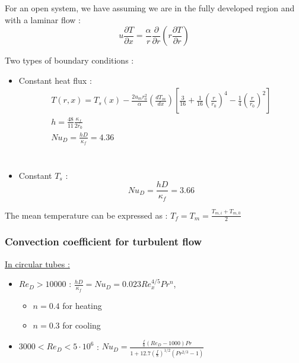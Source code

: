 \documentclass[../main.tex]{subfiles}
\begin{document}
For an open system, we have assuming we are in the fully developed region and with a laminar flow : \begin{equation}
    u \frac{\partial T}{\partial x} = \frac{\alpha}{r} \frac{\partial}{\partial r} (r\frac{\partial T}{\partial r})
\end{equation}

Two types of boundary conditions : \begin{itemize}
    \item Constant heat flux : \begin{equation} \begin{gathered}
        T(r,x) = T_s(x) - \frac{2u_m r_0^2}{\alpha} (\frac{dT_m}{dx}) [\frac{3}{16} + \frac{1}{16}(\frac{r}{r_0})^4 - \frac{1}{4} (\frac{r}{r_0})^2]\\
        h = \frac{48}{11} \frac{\kappa_f}{2r_0}\\
        Nu_D = \frac{hD}{\kappa_f} = 4.36\\
        \end{gathered}
    \end{equation}\\
    \item Constant $T_s$ : \begin{equation}
        Nu_D = \frac{hD}{\kappa_f} = 3.66
    \end{equation}
\end{itemize}

The mean temperature can be expressed as : $T_f = T_m = \frac{T_{m,i} + T_{m,0}}{2}$\\

\subsubsection{Convection coefficient for turbulent flow}

\quad \underline{In circular tubes :}\\
\begin{itemize}
    \item $Re_D > 10000$ : $\frac{hD}{\kappa_f} = Nu_D = 0.023 Re_x^{4/5} Pr^n$, \begin{itemize}
        \item $n=0.4$ for heating\\
        \item $n=0.3$ for cooling\\
    \end{itemize}
    \item $3000<Re_D<5\cdot 10^6$ : $Nu_D = \frac{\frac{f}{8}(Re_D-1000)Pr}{1+12.7(\frac{f}{8})^{1/2}(Pr^{2/3}-1)}$\\
\end{itemize}
\end{document}
